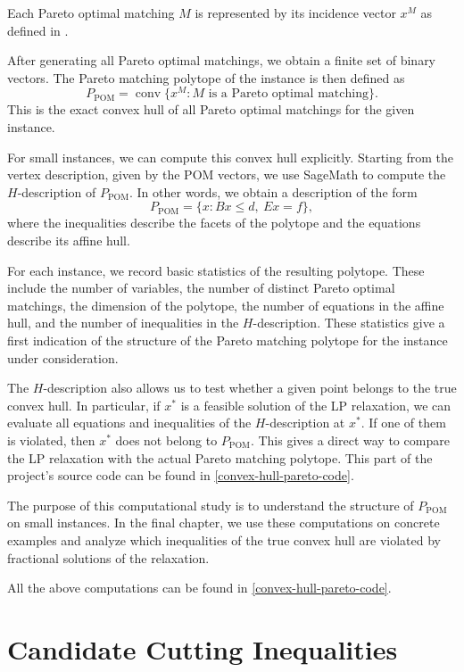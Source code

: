 \documentclass[12pt]{report}
\numberwithin{algorithm}{chapter}
\begin{document}
	Each Pareto optimal matching $M$ is represented by its incidence vector $x^M$ as defined in .
	
	After generating all Pareto optimal matchings, we obtain a finite set of binary vectors. The Pareto matching polytope of the instance is then defined as
	\[
	P_{\mathrm{POM}}=\operatorname{conv}\{x^M : M \text{ is a Pareto optimal matching}\}.
	\]
	This is the exact convex hull of all Pareto optimal matchings for the given instance.
	
	For small instances, we can compute this convex hull explicitly. Starting from the vertex description, given by the POM vectors, we use SageMath to compute the $H$-description of $P_{\mathrm{POM}}$. In other words, we obtain a description of the form
	\[
	P_{\mathrm{POM}}=\{x : Bx\leq d,\ Ex=f\},
	\]
	where the inequalities describe the facets of the polytope and the equations describe its affine hull.
	
	For each instance, we record basic statistics of the resulting polytope. These include the number of variables, the number of distinct Pareto optimal matchings, the dimension of the polytope, the number of equations in the affine hull, and the number of inequalities in the $H$-description. These statistics give a first indication of the structure of the Pareto matching polytope for the instance under consideration.
	
	The $H$-description also allows us to test whether a given point belongs to the true convex hull. In particular, if $x^*$ is a feasible solution of the LP relaxation, we can evaluate all equations and inequalities of the $H$-description at $x^*$. If one of them is violated, then $x^*$ does not belong to $P_{\mathrm{POM}}$. This gives a direct way to compare the LP relaxation with the actual Pareto matching polytope. This part of the project's source code can be found in \eqref{convex-hull-pareto-code}. 
	
	The purpose of this computational study is to understand the structure of $P_{\mathrm{POM}}$ on small instances. In the final chapter, we use these computations on concrete examples and analyze which inequalities of the true convex hull are violated by fractional solutions of the relaxation. 
	
	All the above computations can be found in \eqref{convex-hull-pareto-code}.

\section{Candidate Cutting Inequalities}
\end{document}
